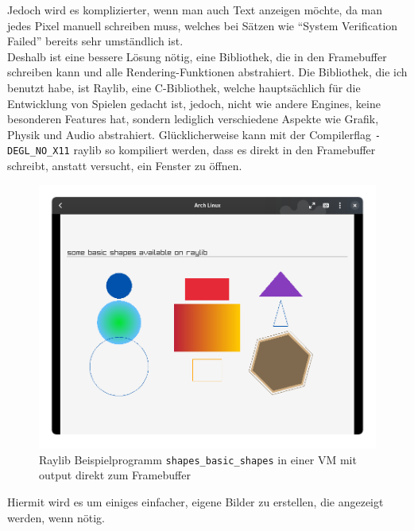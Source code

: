 Jedoch wird es komplizierter, wenn man auch Text anzeigen möchte, da man jedes Pixel manuell schreiben muss, welches bei Sätzen wie ``System Verification Failed'' bereits sehr umständlich ist.\\
Deshalb ist eine bessere Lösung nötig, eine Bibliothek, die in den Framebuffer schreiben kann und alle Rendering-Funktionen abstrahiert. Die Bibliothek, die ich benutzt habe, ist Raylib, eine C-Bibliothek, welche hauptsächlich für die Entwicklung von Spielen gedacht ist, jedoch, nicht wie andere Engines, keine besonderen Features hat, sondern lediglich verschiedene Aspekte wie Grafik, Physik und Audio abstrahiert. Glücklicherweise kann mit der Compilerflag \texttt{-DEGL\_NO\_X11} raylib so kompiliert werden, dass es direkt in den Framebuffer schreibt, anstatt versucht, ein Fenster zu öffnen.
\bigbreak \noindent
\begin{figure}[h]
  \centering
  \includegraphics[scale=0.5]{realisierung/images/raylib-framebuffer.png}
  \caption{Raylib Beispielprogramm \texttt{shapes\_basic\_shapes} in einer VM mit output direkt zum Framebuffer}
\end{figure}

Hiermit wird es um einiges einfacher, eigene Bilder zu erstellen, die angezeigt werden, wenn nötig.

